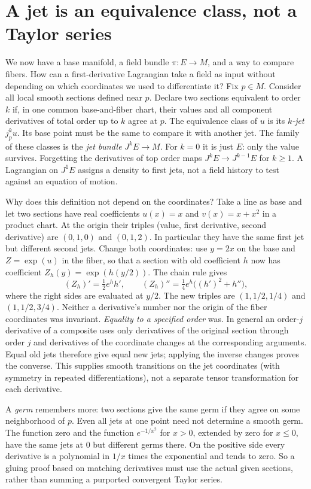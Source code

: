\section{A jet is an equivalence class, not a Taylor series}\label{D-jets}
We now have a base manifold, a field bundle $\pi:E\to M$, and a way to compare fibers. How can a first-derivative Lagrangian take a field as input without depending on which coordinates we used to differentiate it? Fix $p\in M$. Consider all local smooth sections defined near $p$. Declare two sections equivalent to order $k$ if, in one common base-and-fiber chart, their values and all component derivatives of total order up to $k$ agree at $p$. The equivalence class of $u$ is its \emph{$k$-jet} $j^k_pu$. Its base point must be the same to compare it with another jet. The family of these classes is the \emph{jet bundle} $J^kE\to M$. For $k=0$ it is just $E$: only the value survives. Forgetting the derivatives of top order maps $J^kE\to J^{k-1}E$ for $k\geq1$. A Lagrangian on $J^1 E$ assigns a density to first jets, not a field history to test against an equation of motion.

Why does this definition not depend on the coordinates? Take a line as base and let two sections have real coefficients $u(x)=x$ and $v(x)=x+x^2$ in a product chart. At the origin their triples (value, first derivative, second derivative) are $(0,1,0)$ and $(0,1,2)$. In particular they have the same first jet but different second jets. Change both coordinates: use $y=2x$ on the base and $Z=\exp(u)$ in the fiber, so that a section with old coefficient $h$ now has coefficient $Z_h(y)=\exp(h(y/2))$. The chain rule gives
\[
 (Z_h)'=\tfrac12 e^h h',\qquad
 (Z_h)''=\tfrac14 e^h\big((h')^2+h''\big),
\]
where the right sides are evaluated at $y/2$. The new triples are $(1,1/2,1/4)$ and $(1,1/2,3/4)$. Neither a derivative's number nor the origin of the fiber coordinates was invariant. \emph{Equality to a specified order} was. In general an order-$j$ derivative of a composite uses only derivatives of the original section through order $j$ and derivatives of the coordinate changes at the corresponding arguments. Equal old jets therefore give equal new jets; applying the inverse changes proves the converse. This supplies smooth transitions on the jet coordinates (with symmetry in repeated differentiations), not a separate tensor transformation for each derivative.

A \emph{germ} remembers more: two sections give the same germ if they agree on some neighborhood of $p$. Even all jets at one point need not determine a smooth germ. The function zero and the function $e^{-1/x^2}$ for $x>0$, extended by zero for $x\leq0$, have the same jets at $0$ but different germs there. On the positive side every derivative is a polynomial in $1/x$ times the exponential and tends to zero. So a gluing proof based on matching derivatives must use the actual given sections, rather than summing a purported convergent Taylor series.

